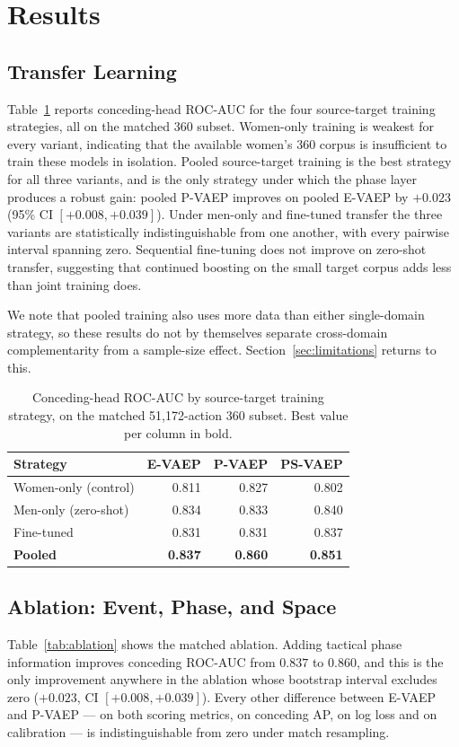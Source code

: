 \documentclass[runningheads]{llncs}
\begin{document}
\section{Results}
\subsection{Transfer Learning}
Table~\ref{tab:transfer} reports conceding-head ROC-AUC for the four source-target training strategies, all on the matched 360 subset. Women-only training is weakest for every variant, indicating that the available women's 360 corpus is insufficient to train these models in isolation. Pooled source-target training is the best strategy for all three variants, and is the only strategy under which the phase layer produces a robust gain: pooled P-VAEP improves on pooled E-VAEP by $+0.023$ (95\% CI $[+0.008, +0.039]$). Under men-only and fine-tuned transfer the three variants are statistically indistinguishable from one another, with every pairwise interval spanning zero. Sequential fine-tuning does not improve on zero-shot transfer, suggesting that continued boosting on the small target corpus adds less than joint training does.

We note that pooled training also uses more data than either single-domain strategy, so these results do not by themselves separate cross-domain complementarity from a sample-size effect. Section~\ref{sec:limitations} returns to this.
\begin{table}[tbp]
\footnotesize
\centering
\caption{Conceding-head ROC-AUC by source-target training strategy, on the matched 51{,}172-action 360 subset. Best value per column in bold.}
\label{tab:transfer}
\begin{tabular}{lrrr}
\toprule
\textbf{Strategy} & \textbf{E-VAEP} & \textbf{P-VAEP} & \textbf{PS-VAEP} \\
\midrule
Women-only (control) & 0.811 & 0.827 & 0.802 \\
Men-only (zero-shot) & 0.834 & 0.833 & 0.840 \\
Fine-tuned & 0.831 & 0.831 & 0.837 \\
\textbf{Pooled} & \textbf{0.837} & \textbf{0.860} & \textbf{0.851} \\
\bottomrule
\end{tabular}
\end{table}
\subsection{Ablation: Event, Phase, and Space}
Table~\ref{tab:ablation} shows the matched ablation. Adding tactical phase information improves conceding ROC-AUC from $0.837$ to $0.860$, and this is the only improvement anywhere in the ablation whose bootstrap interval excludes zero ($+0.023$, CI $[+0.008, +0.039]$). Every other difference between E-VAEP and P-VAEP --- on both scoring metrics, on conceding AP, on log loss and on calibration --- is indistinguishable from zero under match resampling.
\end{document}
